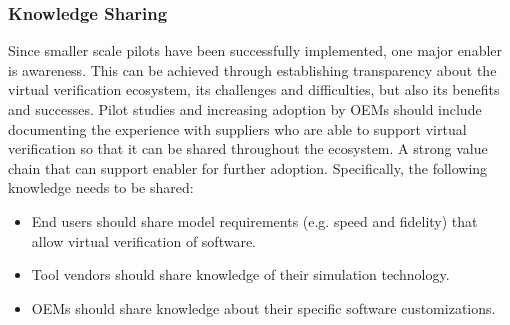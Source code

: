\subsubsection*{Knowledge Sharing}
Since smaller scale pilots have been successfully implemented, one major enabler is awareness.
This can be achieved through establishing transparency about the virtual verification ecosystem, its challenges and difficulties, but also its benefits and successes. 
Pilot studies and increasing adoption by OEMs should include documenting the experience with suppliers who are able to support virtual verification so that it can be shared throughout the ecosystem.
A strong value chain that can support 
enabler for further adoption.
Specifically, the following knowledge needs to be shared:
\begin{itemize}
  \item End users should share model requirements (e.g. speed and fidelity) that allow virtual verification of software.
  \item Tool vendors should share knowledge of their simulation technology.
  \item OEMs should share knowledge about their specific software customizations.
\end{itemize}